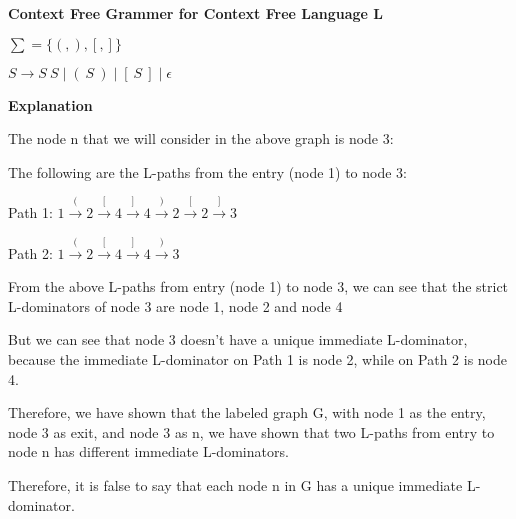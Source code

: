 \documentclass[12pt]{article}
\begin{document}
\begin{enumerate}
\begin{mdframed}

      \textbf{Context Free Grammer for Context Free Language L}

      $ \sum = \{(, ), [, ]\} $

      $ S \rightarrow S \: S \mid ( \: S \: ) \mid [ \: S \: ] \mid \epsilon $

      \textbf{Explanation}

      The node n that we will consider in the above graph is node 3:

      The following are the L-paths from the entry (node 1) to node 3:

      Path 1: $1 \xrightarrow{(} 2 \xrightarrow{[} 4 \xrightarrow{]} 4 \xrightarrow{)} 2 \xrightarrow{[} 2 \xrightarrow{]} 3$
      
      Path 2: $1 \xrightarrow{(} 2 \xrightarrow{[} 4 \xrightarrow{]} 4 \xrightarrow{)} 3$

      From the above L-paths from entry (node 1) to node 3, we can see that the strict L-dominators of node 3 are node 1, node 2 and node 4

      But we can see that node 3 doesn't have a unique immediate L-dominator, because the immediate L-dominator on Path 1 is node 2, while on Path 2 is node 4.

      Therefore, we have shown that the labeled graph G, with node 1 as the entry, node 3 as exit, and node 3 as n, we have shown that two L-paths from entry to node n has different immediate L-dominators.

      Therefore, it is false to say that each node n in G has a unique immediate L-dominator.
      \end{mdframed}
      
  \end{enumerate}
    
\end{document}
